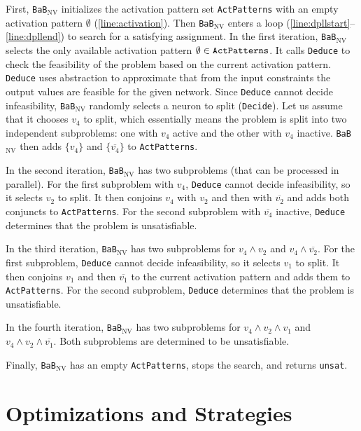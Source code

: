 \documentclass[oneside,11pt,dvipsnames]{book}
\numberwithin{equation}{section}
\theoremstyle{definition}
\theoremstyle{remark}
\newcommand{\functiontextformat}[1]{\textrm{\texttt{#1}}}
\newcommand{\bab}{\texttt{BaB$_{\text{NV}}$}}
\begin{document}
First, \bab{} initializes the activation pattern set \functiontextformat{ActPatterns} with an empty activation pattern $\emptyset$ (\autoref{line:activation}). Then \bab{} enters a loop (\autoref{line:dpllstart}--\autoref{line:dpllend}) to search for a satisfying assignment. In the first iteration, \bab{} selects the only available activation pattern $\emptyset \in \functiontextformat{ActPatterns}$. 
It calls \functiontextformat{Deduce} to check the feasibility of the problem based on the current activation pattern. \functiontextformat{Deduce} uses abstraction to approximate that from the input constraints the output values are feasible for the given network. 
Since \functiontextformat{Deduce} cannot decide infeasibility, \bab{} randomly selects a neuron to split (\functiontextformat{Decide}). Let us assume that it chooses $v_4$ to split, which essentially means the problem is split into two independent subproblems: one with $v_4$ active and the other with $v_4$ inactive.
\bab{} then adds $\{v_4\}$ and $\{\overline{v_4}\}$ to \functiontextformat{ActPatterns}.

In the second iteration, \bab{} has two subproblems (that can be processed in parallel). For the first subproblem with $v_4$, \functiontextformat{Deduce} cannot decide infeasibility, so it selects $v_2$ to split. It then conjoins $v_4$ with $v_2$ and then with $\overline{v_2}$ and adds both conjuncts to \texttt{ActPatterns}. 
For the second subproblem with $\overline{v_4}$ inactive, \functiontextformat{Deduce} determines that the problem is unsatisfiable.

In the third iteration, \bab{} has two subproblems for $v_4 \land v_2$ and $v_4 \land \overline{v_2}$. For the first subproblem, \functiontextformat{Deduce} cannot decide infeasibility, so it selects $v_1$ to split. It then conjoins $v_1$ and then $\overline{v_1}$ to the current activation pattern and adds them to \functiontextformat{ActPatterns}. For the second subproblem, \functiontextformat{Deduce} determines that the problem is unsatisfiable.

In the fourth iteration, \bab{} has two subproblems for $v_4 \land v_2 \land v_1$ and $v_4 \land v_2 \land \overline{v_1}$. Both subproblems are determined to be unsatisfiable.

Finally, \bab{} has an empty \texttt{ActPatterns}, stops the search, and returns \texttt{unsat}.




\part{Optimizations and Strategies}
\end{document}
